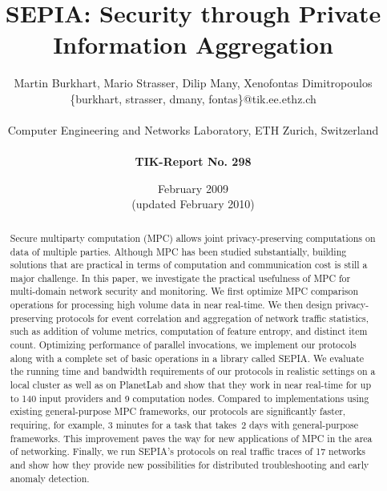 \documentclass[letterpaper,11pt,onecolumn,titlepage]{article}
\begin{document}
\title{SEPIA: Security through Private Information Aggregation}

\author{
  Martin Burkhart, Mario Strasser, Dilip Many, Xenofontas Dimitropoulos \\ 
  \{burkhart, strasser, dmany, fontas\}@tik.ee.ethz.ch \\
   \\
  Computer Engineering and Networks Laboratory,  ETH Zurich, Switzerland  \\
   \\
  \textbf{TIK-Report No. 298}
}

\date{February 2009 \\ (updated February 2010)}

\maketitle

\begin{abstract}
Secure multiparty computation (MPC) allows joint privacy-preserving computations on data of 
multiple parties. Although MPC has been studied substantially,
building solutions that are practical in terms of computation and communication cost is
still a major challenge.
In this paper, we investigate the practical usefulness of MPC
for multi-domain network security and monitoring. 
We first optimize MPC comparison operations for processing high volume data in near real-time.
We then design privacy-preserving protocols for event correlation and
aggregation of network traffic statistics, such as addition of volume
metrics, computation of feature entropy, and distinct item count.   
Optimizing performance of parallel invocations, we implement our protocols
along with a complete set of basic operations in a library called SEPIA. We evaluate the running time and
bandwidth requirements of our protocols in realistic settings on a local cluster as well
as on PlanetLab and show
that they work in near real-time for up to 140 input
providers and 9 computation nodes. Compared to implementations using existing general-purpose
MPC frameworks, our protocols are significantly faster, requiring, for
example, 3 minutes for a task that takes~2 days with general-purpose
frameworks. This improvement paves the way for new applications of MPC in the area of networking.
Finally, we run SEPIA's protocols on real traffic traces of 
17 networks and show how they provide new possibilities for distributed troubleshooting and early
anomaly detection.
\end{abstract}
\end{document}
